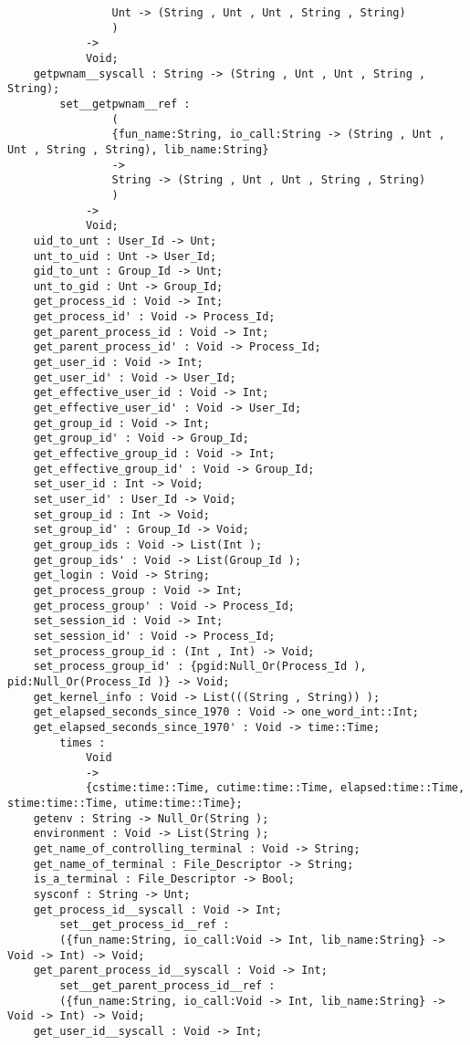 \begin{verbatim}
                Unt -> (String , Unt , Unt , String , String)
                )
            ->
            Void;
    getpwnam__syscall : String -> (String , Unt , Unt , String , String);
        set__getpwnam__ref :
                (
                {fun_name:String, io_call:String -> (String , Unt , Unt , String , String), lib_name:String}
                ->
                String -> (String , Unt , Unt , String , String)
                )
            ->
            Void;
    uid_to_unt : User_Id -> Unt;
    unt_to_uid : Unt -> User_Id;
    gid_to_unt : Group_Id -> Unt;
    unt_to_gid : Unt -> Group_Id;
    get_process_id : Void -> Int;
    get_process_id' : Void -> Process_Id;
    get_parent_process_id : Void -> Int;
    get_parent_process_id' : Void -> Process_Id;
    get_user_id : Void -> Int;
    get_user_id' : Void -> User_Id;
    get_effective_user_id : Void -> Int;
    get_effective_user_id' : Void -> User_Id;
    get_group_id : Void -> Int;
    get_group_id' : Void -> Group_Id;
    get_effective_group_id : Void -> Int;
    get_effective_group_id' : Void -> Group_Id;
    set_user_id : Int -> Void;
    set_user_id' : User_Id -> Void;
    set_group_id : Int -> Void;
    set_group_id' : Group_Id -> Void;
    get_group_ids : Void -> List(Int );
    get_group_ids' : Void -> List(Group_Id );
    get_login : Void -> String;
    get_process_group : Void -> Int;
    get_process_group' : Void -> Process_Id;
    set_session_id : Void -> Int;
    set_session_id' : Void -> Process_Id;
    set_process_group_id : (Int , Int) -> Void;
    set_process_group_id' : {pgid:Null_Or(Process_Id ), pid:Null_Or(Process_Id )} -> Void;
    get_kernel_info : Void -> List(((String , String)) );
    get_elapsed_seconds_since_1970 : Void -> one_word_int::Int;
    get_elapsed_seconds_since_1970' : Void -> time::Time;
        times :
            Void
            ->
            {cstime:time::Time, cutime:time::Time, elapsed:time::Time, stime:time::Time, utime:time::Time};
    getenv : String -> Null_Or(String );
    environment : Void -> List(String );
    get_name_of_controlling_terminal : Void -> String;
    get_name_of_terminal : File_Descriptor -> String;
    is_a_terminal : File_Descriptor -> Bool;
    sysconf : String -> Unt;
    get_process_id__syscall : Void -> Int;
        set__get_process_id__ref :
        ({fun_name:String, io_call:Void -> Int, lib_name:String} -> Void -> Int) -> Void;
    get_parent_process_id__syscall : Void -> Int;
        set__get_parent_process_id__ref :
        ({fun_name:String, io_call:Void -> Int, lib_name:String} -> Void -> Int) -> Void;
    get_user_id__syscall : Void -> Int;

\end{verbatim}
